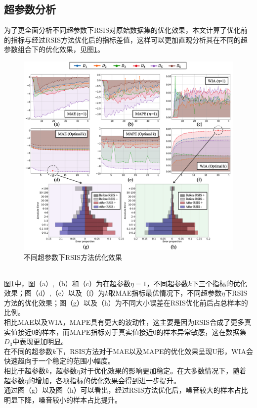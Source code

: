 \documentclass{NauThesis}
\begin{document}
\subsection{超参数分析}
为了更全面分析不同超参数下RSIS对原始数据集的优化效果，本文计算了优化前的指标与经过RSIS方法优化后的指标差值，这样可以更加直观分析其在不同的超参数组合下的优化效果，见图\ref{fig5}。
\begin{figure}[htbp]
    \centering
    \includegraphics[width=1.0\textwidth]{figs/fig5.png}
    \caption{不同超参数下RSIS方法优化效果}
    \label{fig5}
\end{figure}
\\\hspace*{2em}图\ref{fig5}中，图（a）,（b）和（c）为在超参数$\eta=1$，不同超参数$k$下三个指标的优化效果；图（d）,（e）以及（f）为$k$取MAE指标最优情况下，不同超参数$\eta$下RSIS方法的优化效果；图（g）以及（h）为不同大小误差在RSIS优化前后占总样本的比例。
\\\hspace*{2em}相比MAE以及WIA，MAPE具有更大的波动性，这主要是因为RSIS合成了更多真实值接近0的样本，而MAPE指标对于真实值接近0的样本异常敏感，这在数据集$D_3$中表现更加明显。
\\\hspace*{2em}在不同的超参数$k$下，RSIS方法对于MAE以及MAPE的优化效果呈现U形，WIA会快速趋向于一个稳定的范围小幅度。
\\\hspace*{2em}相比于超参数$k$，超参数$\eta$对于优化效果的影响更加稳定。在大多数情况下，随着超参数$\eta$的增加，各项指标的优化效果会得到进一步提升。
\\\hspace*{2em}通过图（g）以及图（h）可以看出，经过RSIS方法优化后，噪音较大的样本占比明显下降，噪音较小的样本占比提升。
\end{document}
